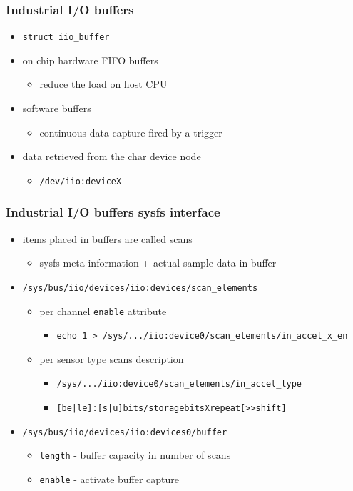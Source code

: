 \documentclass[aspectratio=169]{beamer}
\begin{document}
\begin{frame}
\frametitle{Industrial I/O buffers}
\begin{itemize}
    \item \texttt{struct iio\_buffer}
    \item on chip hardware FIFO buffers
    \begin{itemize}
        \item reduce the load on host CPU
    \end{itemize}
    \item software buffers
    \begin{itemize}
        \item continuous data capture fired by a trigger
     \end{itemize}
    \item data retrieved from the char device node
    \begin{itemize}
        \item \texttt{/dev/iio:deviceX}
     \end{itemize}
\end{itemize}
\end{frame}


\begin{frame}
\frametitle{Industrial I/O buffers sysfs interface}
\begin{itemize}
    \item items placed in buffers are called scans
    \begin{itemize}
        \item sysfs meta information + actual sample data in buffer
    \end{itemize}
    \item \texttt{/sys/bus/iio/devices/iio:devices/scan\_elements}
    \begin{itemize}
        \item per channel \texttt{enable} attribute
        \begin{itemize}
            \item \texttt{echo 1 > /sys/.../iio:device0/scan\_elements/in\_accel\_x\_en}
        \end{itemize}
        \item per sensor type scans description
        \begin{itemize}
            \item \texttt{/sys/.../iio:device0/scan\_elements/in\_accel\_type}
            \item \texttt{[be|le]:[s|u]bits/storagebitsXrepeat[>>shift]}
        \end{itemize}
    \end{itemize}
    \item \texttt{/sys/bus/iio/devices/iio:devices0/buffer}
    \begin{itemize}
        \item \texttt{length} - buffer capacity in number of scans
        \item \texttt{enable} - activate buffer capture
    \end{itemize}
\end{itemize}
\end{frame}
\end{document}
